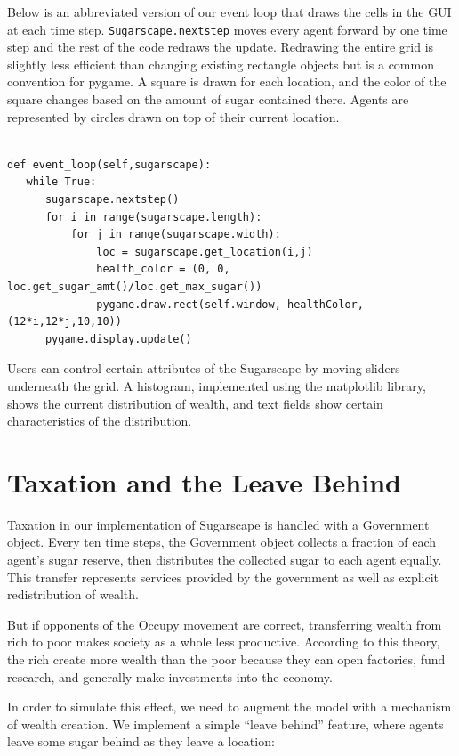 \documentclass[10pt]{book}
\begin{document}
Below is an abbreviated version of our event loop that draws the cells
in the GUI at each time step.  {\tt Sugarscape.nextstep} moves every agent
forward by one time step and the rest of the code redraws the
update. Redrawing the entire grid is slightly less efficient than
changing existing rectangle objects but is a common convention for
pygame. A square is drawn for each location, and the color of the
square changes based on the amount of sugar contained there. Agents
are represented by circles drawn on top of their current location.

\begin{verbatim}

def event_loop(self,sugarscape):
   while True:
      sugarscape.nextstep()
      for i in range(sugarscape.length):
          for j in range(sugarscape.width):
              loc = sugarscape.get_location(i,j)
              health_color = (0, 0, loc.get_sugar_amt()/loc.get_max_sugar())
              pygame.draw.rect(self.window, healthColor,(12*i,12*j,10,10))
      pygame.display.update()
\end{verbatim}

Users can control certain attributes of the Sugarscape by moving
sliders underneath the grid. A histogram, implemented using the
matplotlib library, shows the current distribution of wealth, and text
fields show certain characteristics of the distribution.


\section{Taxation and the Leave Behind}

Taxation in our implementation of Sugarscape is handled with a
Government object. Every ten time steps, the Government object
collects a fraction of each agent's sugar reserve, then distributes
the collected sugar to each agent equally.  This transfer represents
services provided by the government as well as explicit redistribution
of wealth.

But if opponents of the Occupy movement are correct, transferring
wealth from rich to poor makes society as a whole less productive.
According to this theory, the rich create more wealth
than the poor because they can open factories, fund
research, and generally make investments into the
economy.

In order to simulate this effect, we need to augment the model with
a mechanism of wealth creation.  We
implement a simple ``leave behind'' feature, where agents leave some
sugar behind as they leave a location:
\end{document}
